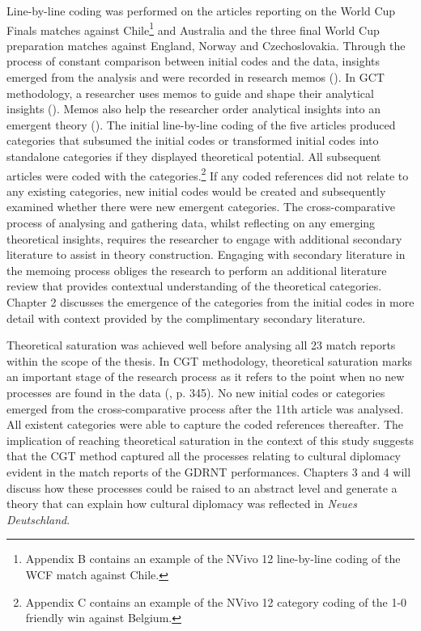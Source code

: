 Line-by-line coding was performed on the articles reporting on the World Cup Finals matches against Chile\footnote{Appendix B contains an example of the NVivo 12 line-by-line coding of the WCF match against Chile.} and Australia and the three final World Cup preparation matches against England, Norway and Czechoslovakia. Through the process of constant comparison between initial codes and the data, insights emerged from the analysis and were recorded in research memos (\cite{charmaz2014}). In GCT methodology, a researcher uses memos to guide and shape their analytical insights (\cite{charmaz2014}). Memos also help the researcher order analytical insights into an emergent theory (\cite{charmaz2014}). The initial line-by-line coding of the five articles produced categories that subsumed the initial codes or transformed initial codes into standalone categories if they displayed theoretical potential. All subsequent articles were coded with the categories.\footnote{Appendix C contains an example of the NVivo 12 category coding of the 1-0 friendly win against Belgium.} If any coded references did not relate to any existing categories, new initial codes would be created and subsequently examined whether there were new emergent categories. The cross-comparative process of analysing and gathering data, whilst reflecting on any emerging theoretical insights, requires the researcher to engage with additional secondary literature to assist in theory construction. Engaging with secondary literature in the memoing process obliges the research to perform an additional literature review that provides contextual understanding of the theoretical categories. Chapter 2 discusses the emergence of the categories from the initial codes in more detail with context provided by the complimentary secondary literature.

Theoretical saturation was achieved well before analysing all 23 match reports within the scope of the thesis. In CGT methodology, theoretical saturation marks an important stage of the research process as it refers to the point when no new processes are found in the data (\cite{charmaz2014}, p. 345). No new initial codes or categories emerged from the cross-comparative process after the 11th article was analysed. All existent categories were able to capture the coded references thereafter. The implication of reaching theoretical saturation in the context of this study suggests that the CGT method captured all the processes relating to cultural diplomacy evident in the match reports of the GDRNT performances. Chapters 3 and 4 will discuss how these processes could be raised to an abstract level and generate a theory that can explain how cultural diplomacy was reflected in \textit{Neues Deutschland}. 
